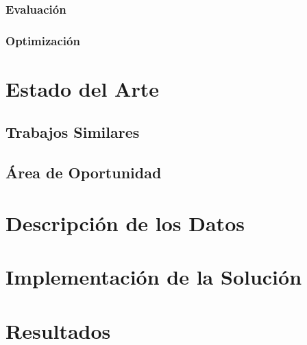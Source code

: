 \subsection{Evaluación}
\subsection{Optimización}

\chapter{Estado del Arte}
\section{Trabajos Similares}
\section{Área de Oportunidad}

\chapter{Descripción de los Datos}


\chapter{Implementación de la Solución}

\chapter{Resultados}

